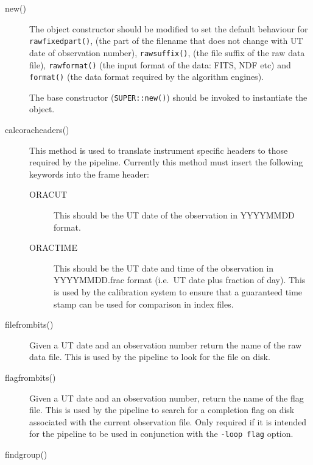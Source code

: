 \documentclass[twoside,11pt]{article}
\renewcommand{\_}{\texttt{\symbol{95}}}
\begin{document}
\begin{description}
\item[new()] \mbox{}

The object constructor should be modified to set the default behaviour
for \texttt{rawfixedpart()}, (the part of the filename that does not
change with UT date of observation number), \texttt{rawsuffix()},
(the file suffix of the raw data file),
\texttt{rawformat()} (the input format of the data: FITS, NDF etc)
and \texttt{format()} (the data format required by the algorithm
engines).

The base constructor (\texttt{SUPER::new()}) should be invoked to
instantiate the object.

\item[calc\_orac\_headers()] \mbox{}

This method is used to translate instrument specific headers to those
required by the pipeline. Currently this method must insert the
following  keywords into the frame header:

\begin{description}
\item[ORACUT] \mbox{}

This should be the UT date of the observation in YYYYMMDD format.

\item[ORACTIME] \mbox{}

This should be the UT date and time of the observation in
YYYYMMDD.frac format (i.e.\ UT date plus fraction of day). This is
used by the calibration system to ensure that a guaranteed time stamp
can be used for comparison in index files.

\end{description}

\item[file\_from\_bits()] \mbox{}

Given a UT date  and an observation number return the name of the 
raw data file. This is used by the pipeline to look for the file on disk.

\item[flag\_from\_bits()] \mbox{}

Given a UT date and an observation number, return the name of the flag 
file. This is used by the pipeline to search for a completion flag on
disk associated with the current observation file. Only required if 
it is intended for the pipeline to be used in conjunction with the 
\texttt{-loop flag} option.

\item[findgroup()] \mbox{}


\end{description}
\end{document}
